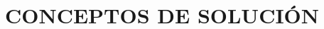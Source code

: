 \documentclass[../General.tex]{subfiles}
\begin{document}
\onehalfspacing
{}

\chapter{CONCEPTOS DE SOLUCIÓN}






\end{document}
